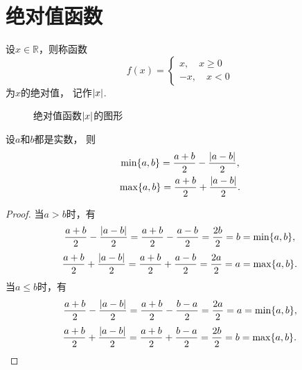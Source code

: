 \section{绝对值函数}
\begin{definition}[绝对值]
设\(x \in \mathbb{R}\)，则称函数\[
	f(x) = \left\{ \begin{array}{c}
		x, \quad x \geq 0 \\
		-x, \quad x < 0
	\end{array} \right.
\]为\(x\)的绝对值，
记作\(\abs{x}\).
\end{definition}

\begin{figure}[ht]
	\centering
	\caption{绝对值函数\(\abs{x}\)的图形}
\end{figure}

\begin{proposition}
设\(a\)和\(b\)都是实数，
则\begin{gather}
	\min\{a,b\}
	= \frac{a+b}{2}
	- \frac{\abs{a-b}}{2}, \\
	\max\{a,b\}
	= \frac{a+b}{2}
	+ \frac{\abs{a-b}}{2}.
\end{gather}
\begin{proof}
当\(a>b\)时，有\[
	\frac{a+b}{2} - \frac{\abs{a-b}}{2}
	= \frac{a+b}{2} - \frac{a-b}{2}
	= \frac{2b}{2} = b
	= \min\{a,b\},
\]\[
	\frac{a+b}{2} + \frac{\abs{a-b}}{2}
	= \frac{a+b}{2} + \frac{a-b}{2}
	= \frac{2a}{2} = a
	= \max\{a,b\}.
\]
当\(a \leq b\)时，有\[
	\frac{a+b}{2} - \frac{\abs{a-b}}{2}
	= \frac{a+b}{2} - \frac{b-a}{2}
	= \frac{2a}{2} = a
	= \min\{a,b\},
\]\[
	\frac{a+b}{2} + \frac{\abs{a-b}}{2}
	= \frac{a+b}{2} + \frac{b-a}{2}
	= \frac{2b}{2} = b
	= \max\{a,b\}.
	\qedhere
\]
\end{proof}
\end{proposition}
